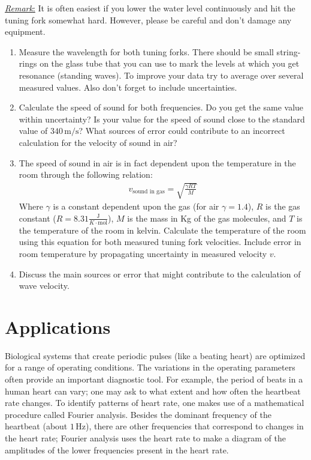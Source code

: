 \underline{\emph{Remark}:} It is often easiest if you lower the water level continuously and hit the tuning fork somewhat hard. However, please be careful and don't damage any equipment.
\begin{enumerate}
\item Measure the wavelength for both tuning forks. There should be small string-rings on the glass tube that you can use to mark the levels at which you get resonance (standing waves). To improve your data try to average over several measured values. Also don't forget to include uncertainties.
\item Calculate the speed of sound for both frequencies. Do you get the same value within uncertainty? Is your value for the speed of sound close to the standard value of $340\,\textrm{m/s}$? What sources of error could contribute to an incorrect calculation for the velocity of sound in air?
\item The speed of sound in air is in fact dependent upon the temperature in the room through the following relation:
\begin{gather}
v_\text{sound in gas} = \sqrt{\frac{\gamma R T}{M}} 
\end{gather}
Where $\gamma$ is a constant dependent upon the gas (for air $\gamma=1.4$), $R$ is the gas constant ($R=8.31 \frac{\text{J}}{{K} \cdot \text{mol}}$), $M$ is the mass in Kg of the gas molecules, and $T$ is the temperature of the room in kelvin. Calculate the temperature of the room using this equation for both measured tuning fork velocities. Include error in room temperature by propagating uncertainty in measured velocity $v$.
\item Discuss the main sources or error that might contribute to the calculation of wave velocity.
\end{enumerate}

\section{Applications}
Biological systems that create periodic pulses (like a beating heart) are optimized for a range of operating conditions. The variations in the operating parameters often provide an important diagnostic tool. For example, the period of beats in a human heart can vary; one may ask to what extent and how often the heartbeat rate changes. To identify patterns of heart rate, one makes use of a mathematical procedure called Fourier analysis. Besides the dominant frequency of the heartbeat (about $1\, \textrm{Hz}$), there are other frequencies that correspond to changes in the heart rate; Fourier analysis uses the heart rate to make a diagram of the amplitudes of the lower frequencies present in the heart rate. \myskip

